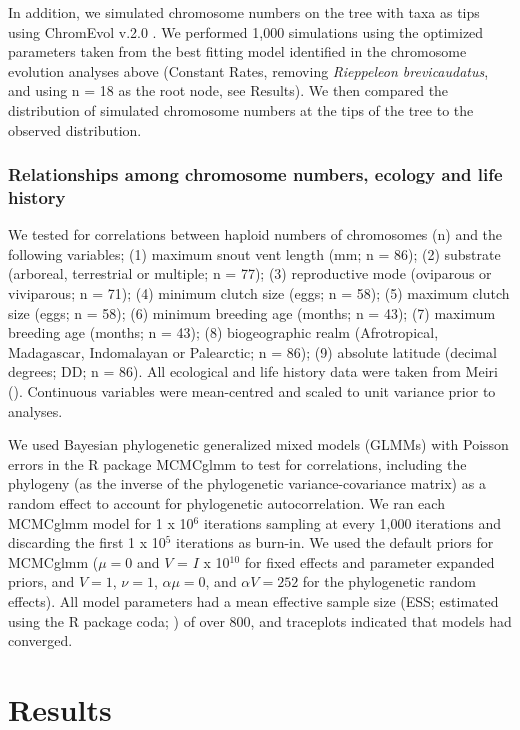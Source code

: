 \documentclass[a4paper, 12pt]{article}
\begin{document}
In addition, we simulated chromosome numbers on the tree with taxa as tips using ChromEvol v.2.0 \citep{glick2014chromevol,mayrose2010probabilistic}. 
We performed 1,000 simulations using the optimized parameters taken from the best fitting model identified in the chromosome evolution analyses above (Constant Rates, removing \textit{Rieppeleon brevicaudatus}, and using n = 18 as the root node, see Results). 
We then compared the distribution of simulated chromosome numbers at the tips of the tree to the observed distribution. 

\subsubsection{Relationships among chromosome numbers, ecology and life history}
We tested for correlations between haploid numbers of chromosomes (n) and the following variables; (1) maximum snout vent length (mm; n = 86); (2) substrate (arboreal, terrestrial or multiple; n = 77); (3) reproductive mode (oviparous or viviparous; n = 71); (4) minimum clutch size (eggs; n = 58); (5) maximum clutch size (eggs; n = 58); (6) minimum breeding age (months; n = 43); (7) maximum breeding age (months; n = 43); (8) biogeographic realm (Afrotropical, Madagascar, Indomalayan or Palearctic; n = 86); (9) absolute latitude (decimal degrees; DD; n = 86). 
All ecological and life history data were taken from Meiri (\citeyear{meiri2018traits}). 
Continuous variables were mean-centred and scaled to unit variance prior to analyses.

We used Bayesian phylogenetic generalized mixed models (GLMMs) with Poisson errors in the R package MCMCglmm \citep{hadfield2010mcmc} to test for correlations, including the phylogeny (as the inverse of the phylogenetic variance-covariance matrix) as a random effect to account for phylogenetic autocorrelation. 
We ran each MCMCglmm model for 1 x 10$^6$ iterations sampling at every 1,000 iterations and discarding the first 1 x 10$^5$ iterations as burn-in. 
We used the default priors for MCMCglmm ($\mu = 0$ and $V$ = $I$ x 10$^{10}$ for fixed effects and parameter expanded priors, and $V = 1$, $\nu = 1$, $\alpha \mu = 0$, and $\alpha V = 252$ for the phylogenetic random effects). 
All model parameters had a mean effective sample size (ESS; estimated using the R package coda; \citealt{plummer2006coda}) of over 800, and traceplots indicated that models had converged.

\section{Results}
\end{document}
